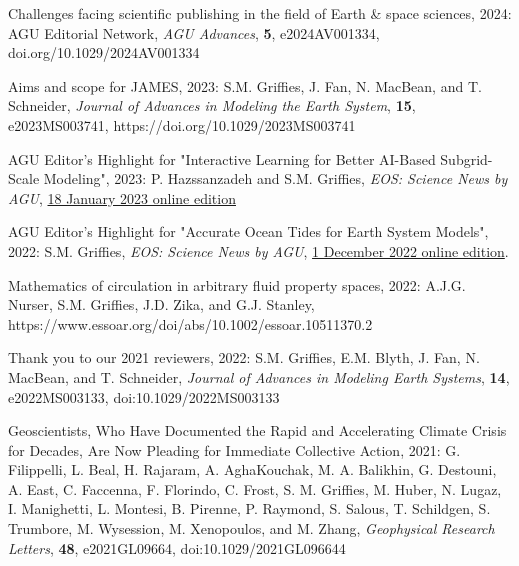 \begin{etaremune}

\item Challenges facing scientific publishing in the field of Earth \& space sciences, 2024: AGU Editorial Network, {\it AGU Advances}, {\bf 5}, e2024AV001334, doi.org/10.1029/2024AV001334

\item Aims and scope for JAMES, 2023: S.M. Grif\/f\/ies, J. Fan, N. MacBean, and T. Schneider, {\it Journal of Advances in Modeling the Earth System}, {\bf 15}, e2023MS003741, 
https://doi.org/10.1029/2023MS003741

\item AGU Editor's Highlight for "Interactive Learning for Better AI-Based Subgrid-Scale Modeling", 2023: P. Hazssanzadeh and S.M. Grif\/f\/ies, {\it EOS: Science News by AGU}, \href{https://eos.org/editor-highlights/interactive-learning-for-better-ai-based-subgrid-scale-modeling}{18 January 2023 online edition} 

\item AGU Editor's Highlight for "Accurate Ocean Tides for Earth System Models", 2022: S.M. Grif\/f\/ies, {\it EOS: Science News by AGU}, \href{https://eos.org/editor-highlights/accurate-ocean-tides-for-earth-system-models}{1 December 2022 online edition}. 

\item Mathematics of circulation in arbitrary fluid property spaces, 2022: A.J.G. Nurser, S.M. Grif\/f\/ies, J.D. Zika, and G.J. Stanley,  https://www.essoar.org/doi/abs/10.1002/essoar.10511370.2

\item Thank you to our 2021 reviewers, 2022:  S.M. Grif\/f\/ies, E.M. Blyth, J. Fan, N. MacBean, and  T. Schneider, {\it Journal of Advances in Modeling Earth Systems}, {\bf 14}, e2022MS003133, doi:10.1029/2022MS003133

\item Geoscientists, Who Have Documented the Rapid and Accelerating Climate Crisis for Decades, Are Now Pleading for Immediate Collective Action, 2021: 
G. Filippelli, L. Beal, H. Rajaram, A. AghaKouchak, M. A. Balikhin, G. Destouni, A. East, C. Faccenna, F. Florindo, C. Frost, S. M. Grif\/f\/ies, M. Huber, N. Lugaz, I. Manighetti, L. Montesi, B. Pirenne, P. Raymond, S. Salous, T. Schildgen, S. Trumbore, M. Wysession, M. Xenopoulos, and M. Zhang, {\it Geophysical Research Letters}, {\bf 48}, e2021GL09664, doi:10.1029/2021GL096644


\end{etaremune}
